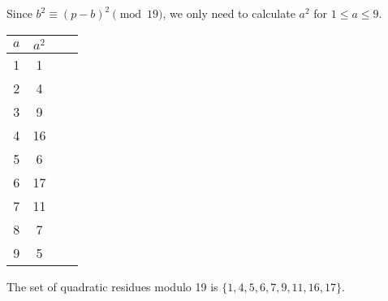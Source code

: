 Since  $b^2 \equiv (p-b)^2 \pmod{19}$, we only need to calculate $a^2$ for 
$1 \leq a \leq 9$.

\begin{table}[H]
\centering
\begin{tabular}{c|cc|c}
	$a$ & $a^2$ \\ \hline
	1   & 1  \\
	2   & 4  \\
	3   & 9  \\
	4   & 16 \\
	5   & 6  \\
	6   & 17 \\
	7   & 11 \\
	8   & 7  \\
	9   & 5
\end{tabular}
\end{table}

The set of quadratic residues modulo 19 is $\{1, 4, 5, 6, 7, 9, 11, 16, 17 \}$.